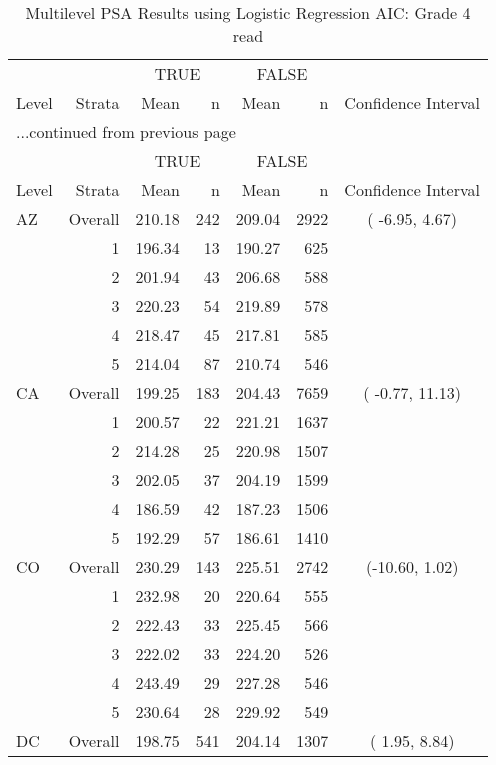 \begin{longtable}{lrrr@{\extracolsep{.25cm}}rrc}
\caption{Multilevel PSA Results using Logistic Regression AIC: Grade 4 read} \\ 
   \hline & & \multicolumn{2}{c}{TRUE} & \multicolumn{2}{c}{FALSE} & \\ \cline{3-4} \cline{5-6} Level & Strata & Mean & n & Mean & n & Confidence Interval \\ \hline\endfirsthead \multicolumn{7}{l}{{...continued from previous page}}\\ \hline  & & \multicolumn{2}{c}{TRUE} & \multicolumn{2}{c}{FALSE} & \\ \cline{3-4} \cline{5-6} Level & Strata & Mean & n & Mean & n & Confidence Interval \\ \hline \endhead \endfoot \endlastfoot  \hline
AZ & Overall & 210.18 & 242 & 209.04 & 2922 & ( -6.95,   4.67) \\ 
   & 1 & 196.34 &  13 & 190.27 & 625 &  \\ 
   & 2 & 201.94 &  43 & 206.68 & 588 &  \\ 
   & 3 & 220.23 &  54 & 219.89 & 578 &  \\ 
   & 4 & 218.47 &  45 & 217.81 & 585 &  \\ 
   & 5 & 214.04 &  87 & 210.74 & 546 &  \\ 
   \hline
CA & Overall & 199.25 & 183 & 204.43 & 7659 & ( -0.77,  11.13) \\ 
   & 1 & 200.57 &  22 & 221.21 & 1637 &  \\ 
   & 2 & 214.28 &  25 & 220.98 & 1507 &  \\ 
   & 3 & 202.05 &  37 & 204.19 & 1599 &  \\ 
   & 4 & 186.59 &  42 & 187.23 & 1506 &  \\ 
   & 5 & 192.29 &  57 & 186.61 & 1410 &  \\ 
   \hline
CO & Overall & 230.29 & 143 & 225.51 & 2742 & (-10.60,   1.02) \\ 
   & 1 & 232.98 &  20 & 220.64 & 555 &  \\ 
   & 2 & 222.43 &  33 & 225.45 & 566 &  \\ 
   & 3 & 222.02 &  33 & 224.20 & 526 &  \\ 
   & 4 & 243.49 &  29 & 227.28 & 546 &  \\ 
   & 5 & 230.64 &  28 & 229.92 & 549 &  \\ 
   \hline
DC & Overall & 198.75 & 541 & 204.14 & 1307 & (  1.95,   8.84) \\ 

\end{longtable}
